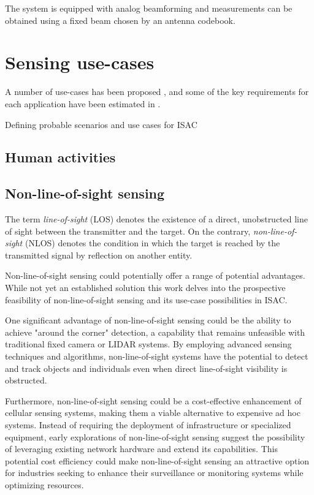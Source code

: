	The system is equipped with analog beamforming and measurements can be obtained using a fixed beam chosen by an antenna codebook.


\section{Sensing use-cases}

	A number of use-cases has been proposed \cite{Mandelli_Henninger_Bauhofer_Wild_2023}, \cite{Wang_Varshney_Gentile_Blandino_Chuang_Golmie_2022} and some of the  key requirements for each application have been estimated in \cite{Wild_Braun_Viswanathan_2021}.
	
	Defining probable scenarios and use cases for ISAC 
	
	
	\subsection{Human activities}
	
	
	
	\subsection{Non-line-of-sight sensing}
	
	The term \textit{line-of-sight} (LOS)  denotes the existence of a direct, unobstructed line of sight between the transmitter and the target. On the contrary, \textit{non-line-of-sight} (NLOS) denotes the condition in which the target is reached by the transmitted signal by reflection on another entity.
	
	Non-line-of-sight sensing could potentially offer a range of potential advantages. While not yet an established solution this work delves into the prospective feasibility of non-line-of-sight sensing and its use-case possibilities in ISAC.
	
	One significant advantage of non-line-of-sight sensing could be the ability to achieve "around the corner" detection, a capability that remains unfeasible with traditional fixed camera or LIDAR systems. By employing advanced sensing techniques and algorithms, non-line-of-sight systems have the potential to detect and track objects and individuals even when direct line-of-sight visibility is obstructed.
	
	Furthermore, non-line-of-sight sensing could be a cost-effective enhancement of cellular sensing systems, making them a viable alternative to expensive ad hoc systems. Instead of requiring the deployment of infrastructure or specialized equipment, early explorations of non-line-of-sight sensing suggest the possibility of leveraging existing network hardware and extend its capabilities. This potential cost efficiency could make non-line-of-sight sensing an attractive option for industries seeking to enhance their surveillance or monitoring systems while optimizing resources.
	
